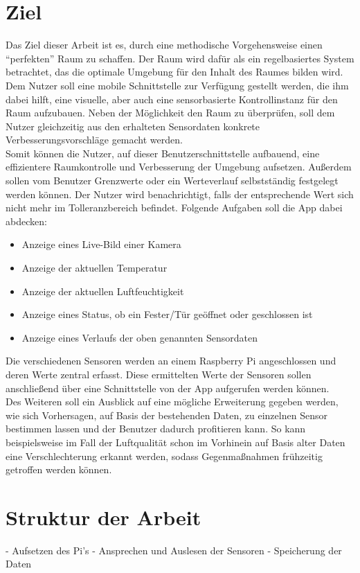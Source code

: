 \section{Ziel}
Das Ziel dieser Arbeit ist es, durch eine methodische Vorgehensweise einen ``perfekten'' Raum zu schaffen. Der Raum wird dafür als ein regelbasiertes System betrachtet, das die optimale Umgebung für den Inhalt des Raumes bilden wird.\\Dem Nutzer soll eine mobile Schnittstelle zur Verfügung gestellt werden, die ihm dabei hilft, eine visuelle, aber auch eine sensorbasierte Kontrollinstanz für den Raum aufzubauen. Neben der Möglichkeit den Raum zu überprüfen, soll dem Nutzer gleichzeitig aus den erhalteten Sensordaten konkrete Verbesserungsvorschläge gemacht werden.\\
Somit können die Nutzer, auf dieser Benutzerschnittstelle aufbauend, eine effizientere Raumkontrolle und Verbesserung der Umgebung aufsetzen.
Außerdem sollen vom Benutzer Grenzwerte oder ein Werteverlauf selbstständig festgelegt werden können. Der Nutzer wird benachrichtigt, falls der entsprechende Wert sich nicht mehr im Tolleranzbereich befindet. 
Folgende Aufgaben soll die App dabei abdecken:
\begin{itemize}
	\item Anzeige eines Live-Bild einer Kamera
	\item Anzeige der aktuellen Temperatur
	\item Anzeige der aktuellen Luftfeuchtigkeit
	\item Anzeige eines Status, ob ein Fester/Tür geöffnet oder geschlossen ist
	\item Anzeige eines Verlaufs der oben genannten Sensordaten
\end{itemize} 
Die verschiedenen Sensoren werden an einem Raspberry Pi angeschlossen und deren Werte zentral erfasst. Diese ermittelten Werte der Sensoren sollen anschließend über eine Schnittstelle von der App aufgerufen werden können. 
\\
Des Weiteren soll ein Ausblick auf eine mögliche Erweiterung gegeben werden, wie sich Vorhersagen, auf Basis der bestehenden Daten, zu einzelnen Sensor bestimmen lassen und der Benutzer dadurch profitieren kann. So kann beispielsweise im Fall der Luftqualität schon im Vorhinein auf Basis alter Daten eine Verschlechterung erkannt werden, sodass Gegenmaßnahmen frühzeitig getroffen werden können.
\section{Struktur der Arbeit}
- Aufsetzen des Pi's
- Ansprechen und Auslesen der Sensoren
- Speicherung der Daten

